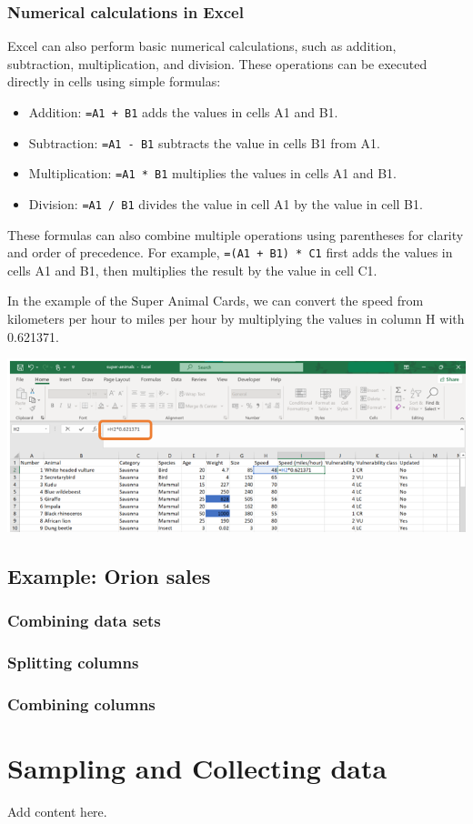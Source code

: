 \documentclass[
]{book}
\begin{document}
\subsection*{Numerical calculations in Excel}\label{numerical-calculations-in-excel}

Excel can also perform basic numerical calculations, such as addition, subtraction, multiplication, and division. These operations can be executed directly in cells using simple formulas:

\begin{itemize}
\item
  Addition: \texttt{=A1\ +\ B1} adds the values in cells A1 and B1.
\item
  Subtraction: \texttt{=A1\ -\ B1} subtracts the value in cells B1 from A1.
\item
  Multiplication: \texttt{=A1\ *\ B1} multiplies the values in cells A1 and B1.
\item
  Division: \texttt{=A1\ /\ B1} divides the value in cell A1 by the value in cell B1.
\end{itemize}

These formulas can also combine multiple operations using parentheses for clarity and order of precedence. For example, \texttt{=(A1\ +\ B1)\ *\ C1} first adds the values in cells A1 and B1, then multiplies the result by the value in cell C1.

In the example of the Super Animal Cards, we can convert the speed from kilometers per hour to miles per hour by multiplying the values in column H with 0.621371.

\begin{center}\includegraphics[width=0.7\linewidth]{Figures/manipulation_3_1} \end{center}

\section{Example: Orion sales}\label{example-orion-sales}

\subsection*{Combining data sets}\label{combining-data-sets}

\subsection*{Splitting columns}\label{splitting-columns}

\subsection*{Combining columns}\label{combining-columns}

\chapter{Sampling and Collecting data}\label{ch3}

Add content here.

  
\end{document}
